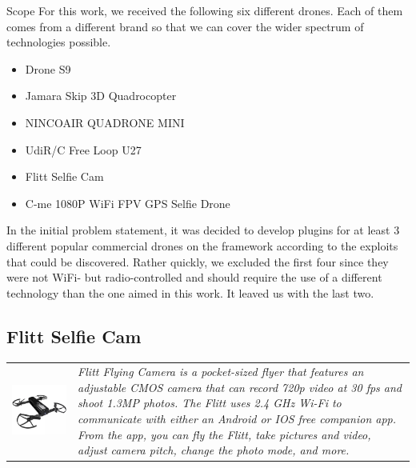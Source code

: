 \begin{chaptercover}{Scope}
For this work, we received the following six different drones. Each of them comes from a different brand so that we can cover the wider spectrum of technologies possible.
\begin{itemize}
  \item Drone S9
  \item Jamara Skip 3D Quadrocopter
  \item NINCOAIR QUADRONE MINI
  \item UdiR/C Free Loop U27 
  \item Flitt Selfie Cam
  \item C-me 1080P WiFi FPV GPS Selfie Drone
\end{itemize}

In the initial problem statement, it was decided to develop plugins for at least 3 different popular commercial drones on the framework according to the exploits that could be discovered. Rather quickly, we excluded the first four since they were not WiFi- but radio-controlled and should require the use of a different technology than the one aimed in this work. It leaved us with the last two.

\subsection{Flitt Selfie Cam}

\begin{center}
\begin{tabular}{m{5cm}m{12.3cm}}
\hyphenation{produced}
\includegraphics[width=\linewidth]{figures/flitt-selfie-cam} & \textit{Flitt Flying Camera is a pocket-sized flyer that features an adjustable CMOS camera that can record 720p video at 30 fps and shoot 1.3MP photos. The Flitt uses 2.4 GHz Wi-Fi to communicate with either an Android or IOS free companion app. From the app, you can fly the Flitt, take pictures and video, adjust camera pitch, change the photo mode, and more.} \\
\end{tabular}
\end{center}


\end{chaptercover}
